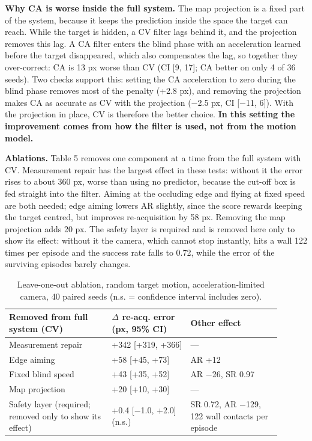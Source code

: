 \documentclass[12pt,a4paper]{article}
\begin{document}
\textbf{Why CA is worse inside the full system.} The map projection is a fixed part of the system, because it keeps the prediction inside the space the target can reach. While the target is hidden, a CV filter lags behind it, and the projection removes this lag. A CA filter enters the blind phase with an acceleration learned before the target disappeared, which also compensates the lag, so together they over-correct: CA is 13 px worse than CV (CI [9, 17]; CA better on only 4 of 36 seeds). Two checks support this: setting the CA acceleration to zero during the blind phase removes most of the penalty (+2.8 px), and removing the projection makes CA as accurate as CV with the projection ($-$2.5 px, CI [$-$11, 6]). With the projection in place, CV is therefore the better choice. \textbf{In this setting the improvement comes from how the filter is used, not from the motion model.}

\textbf{Ablations.} Table 5 removes one component at a time from the full system with CV. Measurement repair has the largest effect in these tests: without it the error rises to about 360 px, worse than using no predictor, because the cut-off box is fed straight into the filter. Aiming at the occluding edge and flying at fixed speed are both needed; edge aiming lowers AR slightly, since the score rewards keeping the target centred, but improves re-acquisition by 58 px. Removing the map projection adds 20 px. The safety layer is required and is removed here only to show its effect: without it the camera, which cannot stop instantly, hits a wall 122 times per episode and the success rate falls to 0.72, while the error of the surviving episodes barely changes.

\begin{table}[htbp]
  \centering
  \small
  \caption{Leave-one-out ablation, random target motion, acceleration-limited camera, 40 paired seeds (n.s. = confidence interval includes zero).}
  \renewcommand{\arraystretch}{1.15}
  \begin{tabular}{>{\raggedright\arraybackslash}p{0.34\linewidth}>{\raggedright\arraybackslash}p{0.26\linewidth}>{\raggedright\arraybackslash}p{0.30\linewidth}}
  \toprule
  \textbf{Removed from full system (CV)} & \textbf{$\Delta$ re-acq. error (px, 95\% CI)} & \textbf{Other effect} \\
  \midrule
  Measurement repair & +342 [+319, +366] & — \\
  Edge aiming & +58 [+45, +73] & AR +12 \\
  Fixed blind speed & +43 [+35, +52] & AR $-$26, SR 0.97 \\
  Map projection & +20 [+10, +30] & — \\
  Safety layer (required; removed only to show its effect) & +0.4 [$-$1.0, +2.0] (n.s.) & SR 0.72, AR $-$129, 122 wall contacts per episode \\
  \bottomrule
  \end{tabular}
\end{table}
\end{document}
